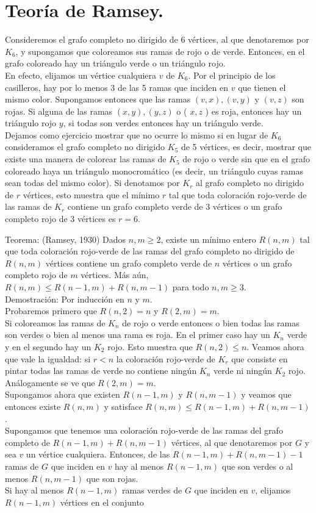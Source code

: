 \documentclass[10pt]{article}
\begin{document}
\section*{Teoría de Ramsey.}
Consideremos el grafo completo no dirigido de 6 vértices, al que denotaremos por $K_{6}$, y supongamos que coloreamos sus ramas de rojo o de verde. Entonces, en el grafo coloreado hay un triángulo verde o un triángulo rojo.\\
En efecto, elijamos un vértice cualquiera $v$ de $K_{6}$. Por el principio de los casilleros, hay por lo menos 3 de las 5 ramas que inciden en $v$ que tienen el mismo color. Supongamos entonces que las ramas $(v, x),(v, y)$ y $(v, z)$ son rojas. Si alguna de las ramas $(x, y),(y, z)$ o ( $x, z$ ) es roja, entonces hay un triángulo rojo $y$, si todas son verdes entonces hay un triángulo verde.\\
Dejamos como ejercicio mostrar que no ocurre lo mismo si en lugar de $K_{6}$ consideramos el grafo completo no dirigido $K_{5}$ de 5 vértices, es decir, mostrar que existe una manera de colorear las ramas de $K_{5}$ de rojo o verde sin que en el grafo coloreado haya un triángulo monocromático (es decir, un triángulo cuyas ramas sean todas del mismo color). Si denotamos por $K_{r}$ al grafo completo no dirigido de $r$ vértices, esto muestra que el mínimo $r$ tal que toda coloración rojo-verde de las ramas de $K_{r}$ contiene un grafo completo verde de 3 vértices o un grafo completo rojo de 3 vértices es $r=6$.

Teorema: (Ramsey, 1930) Dados $n, m \geq 2$, existe un mínimo entero $R(n, m)$ tal que toda coloración rojo-verde de las ramas del grafo completo no dirigido de $R(n, m)$ vértices contiene un grafo completo verde de $n$ vértices o un grafo completo rojo de $m$ vértices. Más aún, $R(n, m) \leq R(n-1, m)+R(n, m-1)$ para todo $n, m \geq 3$.\\
Demostración: Por inducción en $n$ y $m$.\\
Probaremos primero que $R(n, 2)=n$ y $R(2, m)=m$.\\
Si coloreamos las ramas de $K_{n}$ de rojo o verde entonces o bien todas las ramas son verdes o bien al menos una rama es roja. En el primer caso hay un $K_{n}$ verde y en el segundo hay un $K_{2}$ rojo. Esto muestra que $R(n, 2) \leq n$. Veamos ahora que vale la igualdad: si $r<n$ la coloración rojo-verde de $K_{r}$ que consiste en pintar todas las ramas de verde no contiene ningún $K_{n}$ verde ni ningún $K_{2}$ rojo. Análogamente se ve que $R(2, m)=m$.\\
Supongamos ahora que existen $R(n-1, m)$ y $R(n, m-1)$ y veamos que entonces existe $R(n, m)$ y satisface $R(n, m) \leq R(n-1, m)+R(n, m-1)$.\\
Supongamos que tenemos una coloración rojo-verde de las ramas del grafo completo de $R(n-1, m)+R(n, m-1)$ vértices, al que denotaremos por $G$ y sea $v$ un vértice cualquiera. Entonces, de las $R(n-1, m)+R(n, m-1)-1$ ramas de $G$ que inciden en $v$ hay al menos $R(n-1, m)$ que son verdes o al menos $R(n, m-1)$ que son rojas.\\
Si hay al menos $R(n-1, m)$ ramas verdes de $G$ que inciden en $v$, elijamos $R(n-1, m)$ vértices en el conjunto
\end{document}
